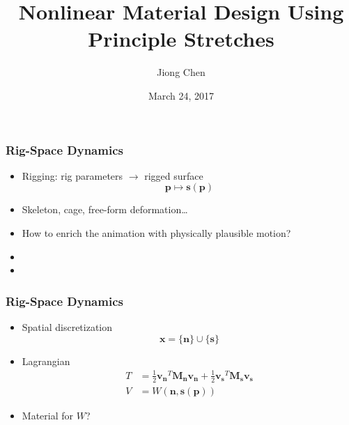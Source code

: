 \documentclass[serif,mathserif]{beamer}
\author[Jiong Chen]{Jiong Chen}
\title[\hspace{2em}\insertframenumber/\inserttotalframenumber]{Nonlinear Material Design Using Principle Stretches}
\date{March 24, 2017}
\newcommand{\BOLD}[1]{\mathbf{#1}}
\begin{document}
\maketitle

\begin{frame}
  \frametitle{Rig-Space Dynamics}
  \begin{itemize}
  \item Rigging: rig parameters $\rightarrow$ rigged surface
    \begin{equation*}
      \BOLD{p} \mapsto \BOLD{s}(\BOLD{p})
    \end{equation*}
    \pause
  \item Skeleton, cage, free-form deformation\dots
    \pause
  \item How to enrich the animation with physically plausible motion?
  \item
  \item
  \end{itemize}
\end{frame}

\begin{frame}
  \frametitle{Rig-Space Dynamics}
  \begin{itemize}
  \item Spatial discretization
    \begin{equation*}
      \BOLD{x} = \{\BOLD{n}\}\cup \{\BOLD{s}\}
    \end{equation*}
    \pause
  \item Lagrangian
    \begin{equation*}
      \begin{split}
        T &= \frac{1}{2}\BOLD{v_n}^T\BOLD{M_n}\BOLD{v_n} +\frac{1}{2}\BOLD{v_s}^T\BOLD{M_s}\BOLD{v_s}\\
        V &= W(\BOLD{n}, \BOLD{s}(\BOLD{p}))
      \end{split}
    \end{equation*}
    \pause
  \item Material for $W$?
  \end{itemize}
\end{frame}
\end{document}
